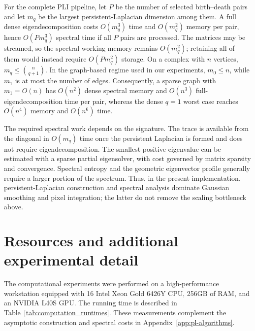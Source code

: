 \documentclass{article}
\begin{document}
For the complete PLI pipeline, let $P$ be the number of selected birth--death
pairs and let $m_q$ be the largest persistent-Laplacian dimension among them.
A full dense eigendecomposition costs $O(m_q^3)$ time and $O(m_q^2)$ memory per
pair, hence $O(Pm_q^3)$ spectral time if all $P$ pairs are processed. The
matrices may be streamed, so the spectral working memory remains $O(m_q^2)$;
retaining all of them would instead require $O(Pm_q^2)$ storage. On a complex
with $n$ vertices, $m_q\leq\binom{n}{q+1}$. In the graph-based regime used in
our experiments, $m_0\leq n$, while $m_1$ is at most the number of edges.
Consequently, a sparse graph with $m_1=O(n)$ has $O(n^2)$ dense spectral
memory and $O(n^3)$ full-eigendecomposition time per pair, whereas the dense
$q=1$ worst case reaches $O(n^4)$ memory and $O(n^6)$ time.

The required spectral work depends on the signature. The trace is available
from the diagonal in $O(m_q)$ time once the persistent Laplacian is formed and
does not require eigendecomposition. The smallest positive eigenvalue can be
estimated with a sparse partial eigensolver, with cost governed by matrix
sparsity and convergence. Spectral entropy and the geometric eigenvector
profile generally require a larger portion of the spectrum. Thus, in the
present implementation, persistent-Laplacian construction and spectral
analysis dominate Gaussian smoothing and pixel integration; the latter do not
remove the scaling bottleneck above.

\section{Resources and additional experimental detail}\label{app:resource}

The computational experiments were performed on a high-performance workstation equipped with 16 Intel Xeon Gold 6426Y CPU, 256GB of RAM, and an NVIDIA L40S GPU. The running time is described in Table~\ref{tab:computation_runtimes}. These measurements complement the asymptotic construction and spectral costs in Appendix~\ref{app:pl-algorithms}.
\end{document}
